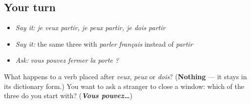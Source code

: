 \subsection*{Your turn}
\begin{itemize}
\raggedright
  \item \emph{Say it:} \emph{je veux partir, je peux partir, je dois partir}
  \item \emph{Say it:} the same three with \emph{parler français} instead of \emph{partir}
  \item \emph{Ask:} \emph{vous pouvez fermer la porte ?}
\end{itemize}

\begin{tcolorbox}[breakable,colback=teal!4,colframe=teal!35!black,title={Before you move on}]
What happens to a verb placed after \emph{veux}, \emph{peux} or \emph{dois}? (\textbf{Nothing} — it stays in its dictionary form.) You want to ask a stranger to close a window: which of the three do you start with? (\emph{\textbf{Vous pouvez…}})
\end{tcolorbox}
